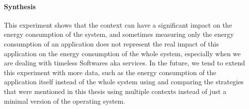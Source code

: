 \paragraph*{Synthesis}
This experiment shows that the context can have a significant impact on the energy consumption of the system, and sometimes measuring only the energy consumption of an application does not represent the real impact of this application on the energy consumption of the whole system, especially when we are dealing with timeless Softwares aka services. 
In the future, we tend to extend this experiment with more data, such as the energy consumption of the application itself instead of the whole system using \cite{fieni2020smartwatts} and comparing the strategies that were mentioned in this thesis using multiple contexts instead of just a minimal version of the operating system.





\vfill \strut  %
\cleardoublepage